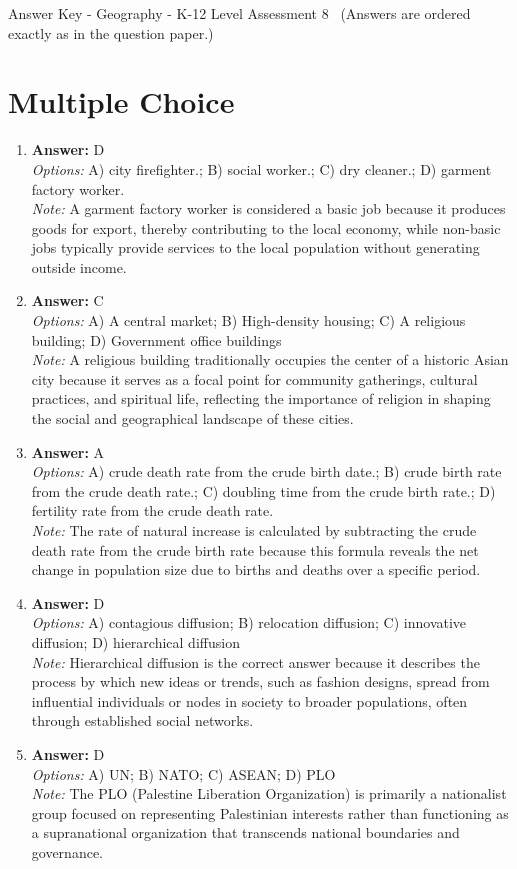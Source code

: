 \documentclass[12pt]{article}
\begin{document}
\begin{center}
Answer Key - Geography - K-12 Level Assessment 8 \
\small (Answers are ordered exactly as in the question paper.)
\end{center}

\section*{Multiple Choice}
\begin{enumerate}[label=\arabic*.]
\item \textbf{Answer:} D
\\ \textit{Options:} A) city firefighter.; B) social worker.; C) dry cleaner.; D) garment factory worker.
\\ \textit{Note:} A garment factory worker is considered a basic job because it produces goods for export, thereby contributing to the local economy, while non-basic jobs typically provide services to the local population without generating outside income.
\item \textbf{Answer:} C
\\ \textit{Options:} A) A central market; B) High-density housing; C) A religious building; D) Government office buildings
\\ \textit{Note:} A religious building traditionally occupies the center of a historic Asian city because it serves as a focal point for community gatherings, cultural practices, and spiritual life, reflecting the importance of religion in shaping the social and geographical landscape of these cities.
\item \textbf{Answer:} A
\\ \textit{Options:} A) crude death rate from the crude birth date.; B) crude birth rate from the crude death rate.; C) doubling time from the crude birth rate.; D) fertility rate from the crude death rate.
\\ \textit{Note:} The rate of natural increase is calculated by subtracting the crude death rate from the crude birth rate because this formula reveals the net change in population size due to births and deaths over a specific period.
\item \textbf{Answer:} D
\\ \textit{Options:} A) contagious diffusion; B) relocation diffusion; C) innovative diffusion; D) hierarchical diffusion
\\ \textit{Note:} Hierarchical diffusion is the correct answer because it describes the process by which new ideas or trends, such as fashion designs, spread from influential individuals or nodes in society to broader populations, often through established social networks.
\item \textbf{Answer:} D
\\ \textit{Options:} A) UN; B) NATO; C) ASEAN; D) PLO
\\ \textit{Note:} The PLO (Palestine Liberation Organization) is primarily a nationalist group focused on representing Palestinian interests rather than functioning as a supranational organization that transcends national boundaries and governance.
\end{enumerate}
\end{document}
